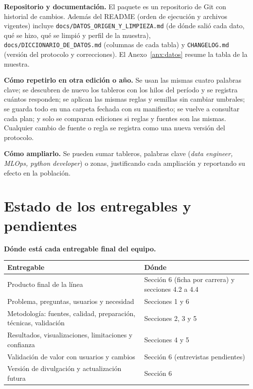 \documentclass[11pt,a4paper]{article}
\begin{document}
\textbf{Repositorio y documentación.} El paquete es un repositorio de Git con historial de cambios. Además del README (orden de ejecución y archivos vigentes) incluye \texttt{docs/DATOS\_ORIGEN\_Y\_LIMPIEZA.md} (de dónde salió cada dato, qué se hizo, qué se limpió y perfil de la muestra), \texttt{docs/DICCIONARIO\_DE\_DATOS.md} (columnas de cada tabla) y \texttt{CHANGELOG.md} (versión del protocolo y correcciones). El Anexo~\ref{anx:datos} resume la tabla de la muestra.

\textbf{Cómo repetirlo en otra edición o año.} Se usan las mismas cuatro palabras clave; se descubren de nuevo los tableros con los hilos del período y se registra cuántos responden; se aplican las mismas reglas y semillas sin cambiar umbrales; se guarda todo en una carpeta fechada con su manifiesto; se vuelve a consultar cada plan; y solo se comparan ediciones si reglas y fuentes son las mismas. Cualquier cambio de fuente o regla se registra como una nueva versión del protocolo.

\textbf{Cómo ampliarlo.} Se pueden sumar tableros, palabras clave (\emph{data engineer, MLOps, python developer}) o zonas, justificando cada ampliación y reportando su efecto en la población.

\clearpage
\section{Estado de los entregables y pendientes}\label{sec:estado}
\textbf{Dónde está cada entregable final del equipo.}
\begin{table}[H]
\centering\small
\begin{tabularx}{\textwidth}{L{6.4cm} X}
\toprule
{}\textbf{Entregable} & \textbf{Dónde}\\
\midrule
Producto final de la línea & Sección 6 (ficha por carrera) y secciones 4.2 a 4.4\\
Problema, preguntas, usuarios y necesidad & Secciones 1 y 6\\
Metodología: fuentes, calidad, preparación, técnicas, validación & Secciones 2, 3 y 5\\
Resultados, visualizaciones, limitaciones y confianza & Secciones 4 y 5\\
Validación de valor con usuarios y cambios & Sección 6 (entrevistas pendientes)\\
Versión de divulgación y actualización futura & Sección 6\\
\bottomrule
\end{tabularx}
\end{table}
\end{document}
